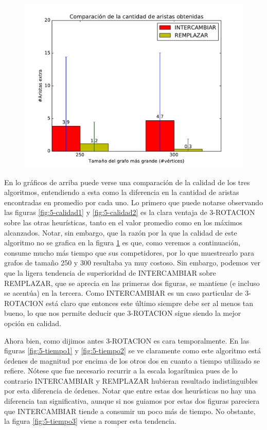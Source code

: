 \begin{figure}[H]
\begin{minipage}{0.49\textwidth}
  \centering
    \includegraphics[width=1\textwidth]{graficos/problema_5/calidad4.pdf}
  \caption{}
  \label{fig:5-calidad3}
\end{minipage}%
\end{figure}

En lo gráficos de arriba puede verse una comparación de la calidad de los tres algoritmos, entendiendo a esta como la diferencia en la cantidad de aristas encontradas en promedio por cada uno. Lo primero que puede notarse observando las figuras \ref{fig:5-calidad1} y \ref{fig:5-calidad2} es la clara ventaja de 3-ROTACION sobre las otras heurísticas, tanto en el valor promedio como en los máximos alcanzados. Notar, sin embargo, que la razón por la que la calidad de este algoritmo no se grafica en la figura \ref{fig:5-calidad3} es que, como veremos a continuación, consume mucho más tiempo que sus competidores, por lo que muestrearlo para grafos de tamaño 250 y 300 resultaba ya muy costoso. Sin embargo, podemos ver que la ligera tendencia de superioridad de INTERCAMBIAR sobre REMPLAZAR, que se aprecia  en las primeras dos figuras, se mantiene (e incluso se acentúa) en la tercera. Como INTERCAMBIAR es un caso particular de 3-ROTACION está claro que entonces este último siempre debe ser al menos tan bueno, lo que nos permite deducir que 3-ROTACION sigue siendo la mejor opción en calidad.

Ahora bien, como dijimos antes 3-ROTACION es cara temporalmente. En las figuras \ref{fig:5-tiempo1} y \ref{fig:5-tiempo2} se ve claramente como este algoritmo está órdenes de magnitud por encima de los otros dos en cuanto a tiempo utilizado se refiere. Nótese que fue necesario recurrir a la escala logarítmica pues de lo contrario INTERCAMBIAR y REMPLAZAR hubieran resultado indistinguibles por esta diferencia de órdenes.  Notar que entre estas dos heurísticas no hay una diferencia tan significativa, aunque si nos guiamos por estas dos figuras pareciera que INTERCAMBIAR tiende a consumir un poco más de tiempo. No obstante, la figura \ref{fig:5-tiempo3} viene a romper esta tendencia. 

